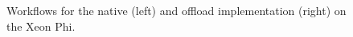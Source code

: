 \begin{figure}[!htp]
	\begin{center}
		\caption{Workflows for the native (left) and offload implementation (right) on the \intel Xeon Phi.}
		\label{fig:MICWorkflows}
	\end{center}
\end{figure}

